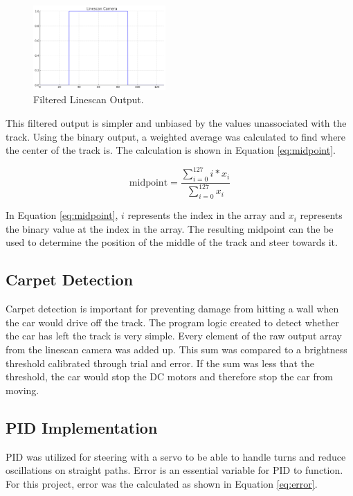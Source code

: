 \documentclass[conference]{IEEEtran}
\begin{document}
\begin{figure}[htbp]
	\centerline{\includegraphics[width=0.45\textwidth]{images/linescanFiltered.png}}
	\caption{Filtered Linescan Output.}
	\label{fig:linescanFiltered}
\end{figure}

This filtered output is simpler and unbiased by the values unassociated with the track. Using the binary output, a weighted average was calculated to find where the center of the track is. The calculation is shown in Equation \ref{eq:midpoint}.

\begin{equation}
	\text{midpoint} = \frac{\sum_{i=0}^{127} i*x_i}{\sum_{i=0}^{127} x_i}\label{eq:midpoint}
\end{equation}

In Equation \ref{eq:midpoint}, $i$ represents the index in the array and $x_i$ represents the binary value at the index in the array. The resulting midpoint can the be used to determine the position of the middle of the track and steer towards it.

\subsection{Carpet Detection}

Carpet detection is important for preventing damage from hitting a wall when the car would drive off the track. The program logic created to detect whether the car has left the track is very simple. Every element of the raw output array from the linescan camera was added up. This sum was compared to a brightness threshold calibrated through trial and error. If the sum was less that the threshold, the car would stop the DC motors and therefore stop the car from moving.

\subsection{PID Implementation}

PID was utilized for steering with a servo to be able to handle turns and reduce oscillations on straight paths. Error is an essential variable for PID to function. For this project, error was the calculated as shown in Equation \ref{eq:error}.
\end{document}
